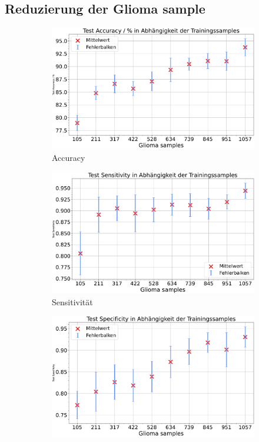 \subsection{Reduzierung der Glioma sample}
\begin{figure}[H]
  \centering
  \begin{subfigure}[b]{0.48\textwidth}
    \centering
    \includegraphics[width=\textwidth]{plots/Reduzierung-Gli + Balnce_Accuracy_mean.pdf}
    \caption{Accuracy}
    \label{fig:gli-red-acc}
  \end{subfigure}
  \begin{subfigure}[b]{0.48\textwidth}
    \centering
    \includegraphics[width=\textwidth]{plots/Reduzierung-Gli + Balnce_Sensitivity_mean.pdf}
    \caption{Sensitivität}
    \label{fig:gli-red-sens}
  \end{subfigure}
  \begin{subfigure}[b]{0.48\textwidth}
    \centering
    \includegraphics[width=\textwidth]{plots/Reduzierung-Gli + Balnce_Specificity_mean.pdf}

\end{subfigure}
\end{figure}
